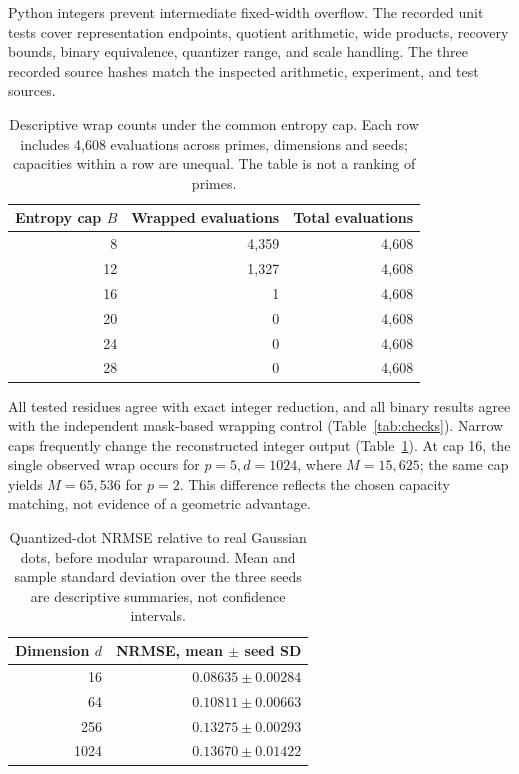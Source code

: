 \documentclass[11pt]{article}
\begin{document}
Python integers prevent intermediate fixed-width overflow. The recorded
unit tests cover representation endpoints, quotient arithmetic, wide
products, recovery bounds, binary equivalence, quantizer range, and scale
handling. The three recorded source hashes match the inspected arithmetic,
experiment, and test sources.

\begin{table}[htbp]
\centering
\caption{Descriptive wrap counts under the common entropy cap. Each row includes
4,608 evaluations across primes, dimensions and seeds; capacities within a row
are unequal. The table is not a ranking of primes.}
\begin{tabular}{rrr}
\toprule
Entropy cap \(B\) & Wrapped evaluations & Total evaluations\\
\midrule
8 & 4,359 & 4,608\\
12 & 1,327 & 4,608\\
16 & 1 & 4,608\\
20 & 0 & 4,608\\
24 & 0 & 4,608\\
28 & 0 & 4,608\\
\bottomrule
\end{tabular}
\label{tab:wrap}
\end{table}

All tested residues agree with exact integer reduction, and all binary
results agree with the independent mask-based wrapping control
(Table~\ref{tab:checks}). Narrow caps frequently change the reconstructed
integer output (Table~\ref{tab:wrap}). At cap 16, the single observed wrap
occurs for \(p=5,d=1024\), where \(M=15,625\); the same cap yields
\(M=65,536\) for \(p=2\). This difference reflects the chosen capacity
matching, not evidence of a geometric advantage.

\begin{table}[htbp]
\centering
\caption{Quantized-dot NRMSE relative to real Gaussian dots, before modular
wraparound. Mean and sample standard deviation over the three seeds are
descriptive summaries, not confidence intervals.}
\begin{tabular}{rr}
\toprule
Dimension \(d\) & NRMSE, mean \(\pm\) seed SD\\
\midrule
16 & \(0.08635\pm0.00284\)\\
64 & \(0.10811\pm0.00663\)\\
256 & \(0.13275\pm0.00293\)\\
1024 & \(0.13670\pm0.01422\)\\
\bottomrule
\end{tabular}
\label{tab:quantization}
\end{table}
\end{document}

